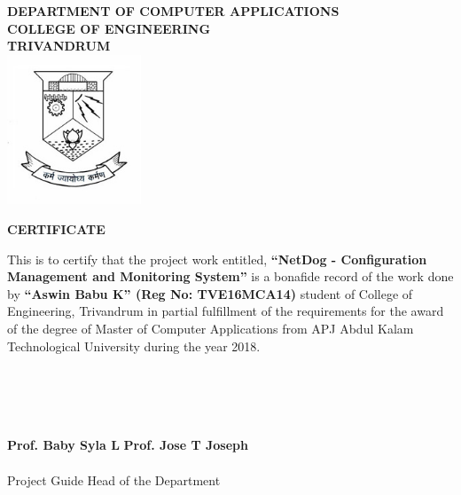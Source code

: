 \begin{titlepage}
\begin{center}

\textbf{DEPARTMENT OF COMPUTER APPLICATIONS}\\[0.5cm]
\textbf{ COLLEGE OF ENGINEERING \\ TRIVANDRUM}\\
[0.5cm]

\vspace{1.2cm}
\includegraphics[width=0.30\textwidth]{2.jpg}\\
\vspace{0.8cm}

\textbf{CERTIFICATE}\\
\end{center}

This is to certify that the project work entitled,
\textbf{``NetDog - Configuration Management and Monitoring System''} is a
bonafide record of the work done by \textbf{``Aswin Babu K''
(Reg No: TVE16MCA14)} student of College of Engineering, Trivandrum in partial
fulfillment of the requirements for the award of the degree of Master of
Computer Applications from APJ Abdul Kalam Technological University during the
year 2018.\\ \\ \\ \\ \\

\vspace{3 cm}

\noindent\textbf{Prof. Baby Syla L}
\hfill \textbf{Prof. Jose T Joseph}
\\ \\
\noindent
Project Guide
\hfill Head of the Department

\end{titlepage}
